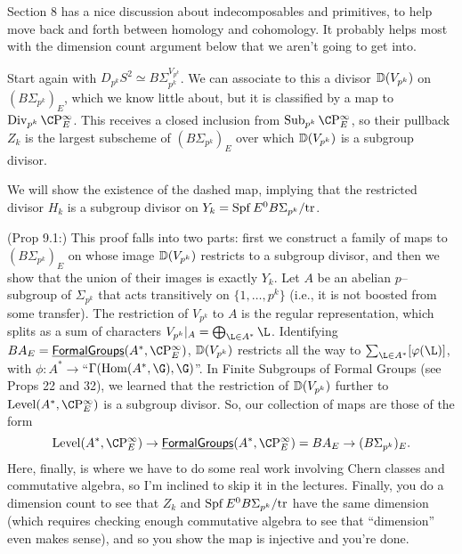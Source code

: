 Section 8 has a nice discussion about indecomposables and primitives, to help move back and forth between homology and cohomology.  It probably helps most with the dimension count argument below that we aren't going to get into.

Start again with $D_{p^k} S^2 \simeq B\Sigma_{p^k}^{V_{p^k}}$.  We can associate to this a divisor $\mathbb D(V_{p^k})$ on $(B\Sigma_{p^k})_E$, which we know little about, but it is classified by a map to $\Div_{p^k} \CP^\infty_E$.  This receives a closed inclusion from $\Sub_{p^k} \CP^\infty_E$, so their pullback $Z_k$ is the largest subscheme of $(B\Sigma_{p^k})_E$ over which $\mathbb D(V_{p^k})$ is a subgroup divisor.
\begin{center}
\end{center}
We will show the existence of the dashed map, implying that the restricted divisor $H_k$ is a subgroup divisor on $Y_k = \operatorname{Spf} E^0 B\Sigma_{p^k} / \mathrm{tr}$.

(Prop 9.1:) This proof falls into two parts: first we construct a family of maps to $(B\Sigma_{p^k})_E$ on whose image $\mathbb D(V_{p^k})$ restricts to a subgroup divisor, and then we show that the union of their images is exactly $Y_k$.  Let $A$ be an abelian $p$--subgroup of $\Sigma_{p^k}$ that acts transitively on $\{1, \ldots, p^k\}$ (i.e., it is not boosted from some transfer).  The restriction of $V_{p^k}$ to $A$ is the regular representation, which splits as a sum of characters $V_{p^k}|_A = \bigoplus_{\L \in A^*} \L$.  Identifying $BA_E = \InternalHom{FormalGroups}(A^*, \CP^\infty_E)$, $\mathbb D(V_{p^k})$ restricts all the way to $\sum_{\L \in A^*} [\phi(\L)]$, with $\phi: A^* \to $``$\Gamma(\operatorname{Hom}(A^*, \G), \G)$''.  In Finite Subgroups of Formal Groups (see Props 22 and 32), we learned that the restriction of $\mathbb D(V_{p^k})$ further to $\Level(A^*, \CP^\infty_E)$ is a subgroup divisor.  So, our collection of maps are those of the form \[\Level(A^*, \CP^\infty_E) \to \InternalHom{FormalGroups}(A^*, \CP^\infty_E) = BA_E \to (B\Sigma_{p^k})_E.\]  Here, finally, is where we have to do some real work involving Chern classes and commutative algebra, so I'm inclined to skip it in the lectures.  Finally, you do a dimension count to see that $Z_k$ and $\operatorname{Spf} E^0 B\Sigma_{p^k} / \mathrm{tr}$ have the same dimension (which requires checking enough commutative algebra to see that ``dimension'' even makes sense), and so you show the map is injective and you're done.


